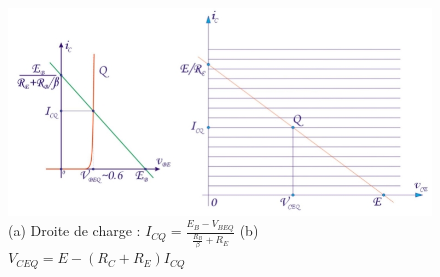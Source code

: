 \begin{figure}[h!]
	\centering
	\includegraphics[width=12cm]{figures/ch02/general2.jpg}
	\caption{(a) Droite de charge : $I_{CQ} = \frac{E_B - V_{BEQ}}{\frac{R_B}{\beta} + R_E}$ (b) $V_{CEQ} = E - (R_C + R_E) I_{CQ}$}
	\label{fig:general2}
\end{figure}

